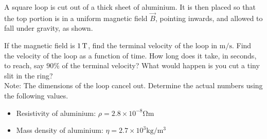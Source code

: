 \documentclass[fleqn, a4paper, 11pt, oneside]{amsart}
\theoremstyle{definition}
\theoremstyle{theorem}
\begin{document}
\begin{question}
	A square loop is cut out of a thick sheet of aluminium.
	It is then placed so that the top portion is in a uniform magnetic field $\overrightarrow{B}$, pointing inwards, and allowed to fall under gravity, as shown.
	\begin{figure}[H]
	\end{figure}
	If the magnetic field is $1 \tesla$, find the terminal velocity of the loop in $\si{\metre\per\second}$.
	Find the velocity of the loop as a function of time.
	How long does it take, in seconds, to reach, say $90\%$ of the terminal velocity?
	What would happen is you cut a tiny slit in the ring?\\
	Note: The dimensions of the loop cancel out.
	Determine the actual numbers using the following values.
	\begin{itemize}
		\item Resistivity of aluminium: $\rho = 2.8 \times 10^{-8} \si{\ohm\metre}$
		\item Mass density of aluminium: $\eta = 2.7 \times 10^3 \si{\kg\per\metre\cubed}$
	\end{itemize}
\end{question}
\end{document}
